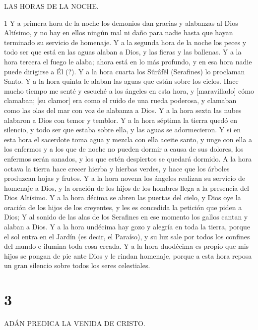 \par LAS HORAS DE LA NOCHE.

\par 1 Y a primera hora de la noche los demonios dan gracias y alabanzas al Dios Altísimo, y no hay en ellos ningún mal ni daño para nadie hasta que hayan terminado su servicio de homenaje. Y a la segunda hora de la noche los peces y todo ser que está en las aguas alaban a Dios, y las fieras y las ballenas. Y a la hora tercera el fuego le alaba; ahora está en lo más profundo, y en esa hora nadie puede dirigirse a Él (?). Y a la hora cuarta los Sûrâfêl (Serafines) lo proclaman Santo. Y a la hora quinta le alaban las aguas que están sobre los cielos. Hace mucho tiempo me senté y escuché a los ángeles en esta hora, y [maravillado] cómo clamaban; [su clamor] era como el ruido de una rueda poderosa, y clamaban como las olas del mar con voz de alabanza a Dios. Y a la hora sexta las nubes alabaron a Dios con temor y temblor. Y a la hora séptima la tierra quedó en silencio, y todo ser que estaba sobre ella, y las aguas se adormecieron. Y si en esta hora el sacerdote toma agua y mezcla con ella aceite santo, y unge con ella a los enfermos y a los que de noche no pueden dormir a causa de sus dolores, los enfermos serán sanados, y los que estén despiertos se quedará dormido. A la hora octava la tierra hace crecer hierba y hierbas verdes, y hace que los árboles produzcan hojas y frutos. Y a la hora novena los ángeles realizan su servicio de homenaje a Dios, y la oración de los hijos de los hombres llega a la presencia del Dios Altísimo. Y a la hora décima se abren las puertas del cielo, y Dios oye la oración de los hijos de los creyentes, y les es concedida la petición que piden a Dios; Y al sonido de las alas de los Serafines en ese momento los gallos cantan y alaban a Dios. Y a la hora undécima hay gozo y alegría en toda la tierra, porque el sol entra en el Jardín (es decir, el Paraíso), y su luz sale por todos los confines del mundo e ilumina toda cosa creada. Y a la hora duodécima es propio que mis hijos se pongan de pie ante Dios y le rindan homenaje, porque a esta hora reposa un gran silencio sobre todos los seres celestiales.

\chapter{3}

\par ADÁN PREDICA LA VENIDA DE CRISTO.

